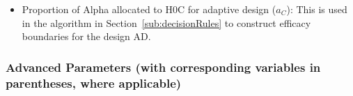 \documentclass[article]{jss}
\begin{document}
\begin{itemize}
\item Proportion of Alpha allocated to H0C for adaptive design ($a_C$): This is used in the algorithm in Section~\ref{sub:decisionRules} to construct efficacy boundaries for the design AD.


\end{itemize}

\subsubsection{Advanced Parameters (with corresponding variables in parentheses, where applicable)}
\label{sub:advanced-parameters}
\end{document}
